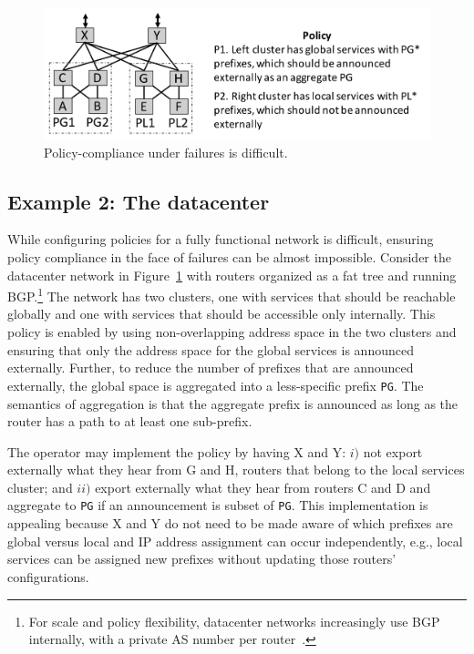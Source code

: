 \documentclass[10pt]{sigalternate052015}
\newcommand{\CD}[1]{\texttt{\small #1}}  %
\begin{document}
\begin{figure}[t!]
  \centering
  \includegraphics[width=\columnwidth]{figures/example2}
  \caption{Policy-compliance under failures is difficult.}
  \label{fig:example2}
  \vspace{-1em}
\end{figure}

\subsection{Example 2:  The datacenter}

 While configuring policies for a fully functional network is difficult, ensuring policy compliance in the face of failures can be almost impossible. Consider the datacenter network in Figure~\ref{fig:example2} with routers organized as a fat tree and running BGP.\footnote{For scale and policy flexibility, datacenter networks increasingly use BGP internally, with a private AS number per router~\cite{bgp-in-dc}.} The network has two clusters, one with services that should be reachable globally and one with services that should be accessible only internally. This policy is enabled by using non-overlapping address space in the two clusters and ensuring that only the address space for the global services is announced externally. Further, to reduce the number of prefixes that are announced externally, the global space is aggregated into a less-specific prefix \CD{PG}. The semantics of aggregation is that the aggregate prefix is announced as long as the router has a path to at least one sub-prefix.

The operator may implement the policy by having X and Y: $i)$ not export externally what they hear from G and H, routers that belong to the local services cluster; and $ii)$ export externally what they hear from routers C and D and aggregate to \CD{PG} if an announcement is subset of \CD{PG}. This implementation is appealing because X and Y do not need to be made aware of which prefixes are global versus local and IP address assignment can occur independently, e.g., local services can be assigned new prefixes without updating those routers' configurations.
\end{document}
